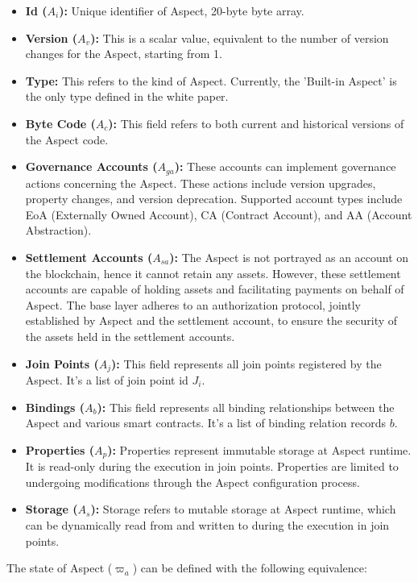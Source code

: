 \begin{itemize}
  \item \textbf{Id ($A_i$):} Unique identifier of Aspect, 20-byte byte array.
  \item \textbf{Version ($A_{v}$):} This is a scalar value, equivalent to the number of version changes for the Aspect, starting from 1.
  \item \textbf{Type:} This refers to the kind of Aspect. Currently, the 'Built-in Aspect' is the only type defined in the white paper.
  \item \textbf{Byte Code ($A_{c}$):} This field refers to both current and historical versions of the Aspect code.
  \item \textbf{Governance Accounts ($A_{ga}$):} These accounts can implement governance actions concerning the Aspect. These actions include version upgrades, property changes, and version deprecation. Supported account types include EoA (Externally Owned Account), CA (Contract Account), and AA (Account Abstraction).
  \item \textbf{Settlement Accounts ($A_{sa}$):} The Aspect is not portrayed as an account on the blockchain, hence it cannot retain any assets. However, these settlement accounts are capable of holding assets and facilitating payments on behalf of Aspect. The base layer adheres to an authorization protocol, jointly established by Aspect and the settlement account, to ensure the security of the assets held in the settlement accounts.
  \item \textbf{Join Points ($A_{j}$):} This field represents all join points registered by the Aspect. It's a list of join point id $J_i$.
  \item \textbf{Bindings ($A_{b}$):} This field represents all binding relationships between the Aspect and various smart contracts. It's a list of binding relation records $b$.
  \item \textbf{Properties ($A_{p}$):} Properties represent immutable storage at Aspect runtime. It is read-only during the execution in join points. Properties are limited to undergoing modifications through the Aspect configuration process.
  \item \textbf{Storage ($A_s$):} Storage refers to mutable storage at Aspect runtime, which can be dynamically read from and written to during the execution in join points.
\end{itemize}

The state of Aspect ($\varpi_a$) can be defined with the following equivalence:

